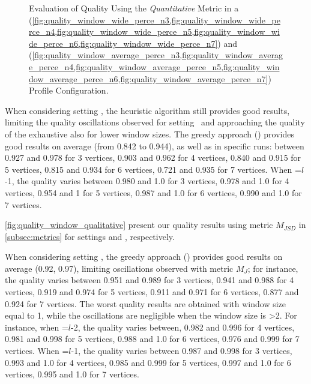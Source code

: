 \begin{figure}[H]
\begin{adjustbox}{minipage=\linewidth,scale=0.75}
    \caption{Evaluation of Quality Using the \emph{Quantitative} Metric in a \wide (\cref{fig:quality_window_wide_perce_n3,fig:quality_window_wide_perce_n4,fig:quality_window_wide_perce_n5,fig:quality_window_wide_perce_n6,fig:quality_window_wide_perce_n7}) and \average (\cref{fig:quality_window_average_perce_n3,fig:quality_window_average_perce_n4,fig:quality_window_average_perce_n5,fig:quality_window_average_perce_n6,fig:quality_window_average_perce_n7}) Profile Configuration.}  \label{fig:quality_window_perce}
  \end{adjustbox}
  \end{figure}

  When considering setting \average, the heuristic algorithm still provides good results, limiting the quality oscillations observed for setting \wide\ and approaching the quality of the exhaustive also for lower window sizes. The greedy approach () provides good results on average (from 0.842 to 0.944), as well as in specific runs: between 0.927 and 0.978 for 3 vertices, 0.903 and 0.962 for 4 vertices, 0.840 and 0.915 for 5 vertices, 0.815 and 0.934 for 6 vertices, 0.721 and 0.935 for 7 vertices.
  When \windowsize=$l$-1, the quality varies between 0.980 and 1.0 for 3 vertices, 0.978 and 1.0 for 4 vertices, 0.954 and 1 for 5 vertices, 0.987 and 1.0 for 6 vertices, 0.990 and 1.0 for 7 vertices.

  \cref{fig:quality_window_qualitative} present our quality results using metric $M_{JSD}$ in \cref{subsec:metrics} for settings \wide and \average, respectively.

  When considering setting \wide, the greedy approach () provides good results on average (0.92, 0.97), limiting oscillations observed with metric $M_J$; for instance, the quality varies between 0.951 and 0.989 for 3 vertices, 0.941 and 0.988 for 4 vertices, 0.919 and 0.974 for 5 vertices, 0.911 and 0.971 for 6 vertices, 0.877 and 0.924 for 7 vertices.
  The worst quality results are obtained with window size equal to 1, while the oscillations are negligible when the window size is >2. For instance, when \windowsize=$l$-2, the quality varies between, 0.982 and 0.996 for 4 vertices, 0.981 and 0.998 for 5 vertices, 0.988 and 1.0 for 6 vertices, 0.976 and 0.999 for 7 vertices. When \windowsize=$l$-1, the quality varies between  0.987 and  0.998 for 3 vertices, 0.993 and 1.0 for 4 vertices, 0.985 and 0.999 for 5 vertices, 0.997 and 1.0 for 6 vertices, 0.995 and 1.0  for 7 vertices.

